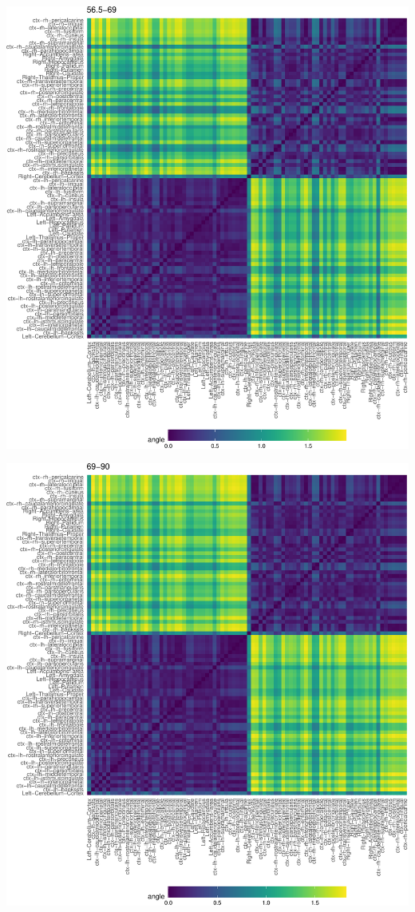 \documentclass[12pt]{article}
\begin{document}
\begin{center}\includegraphics[width=1\linewidth]{draft_files/figure-latex/cosine-heatmap-2-3} \end{center}

\begin{center}\includegraphics[width=1\linewidth]{draft_files/figure-latex/cosine-heatmap-2-4} \end{center}
\end{document}
